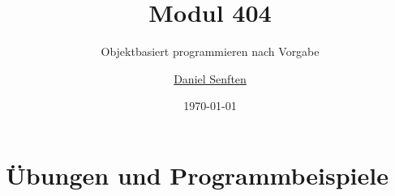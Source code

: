 \documentclass{manual}
\title{Modul 404}
\subtitle{Objektbasiert programmieren nach Vorgabe}
\date{\today}
\author{\href{mailto:daniel.senften@talent-factory.ch}{Daniel Senften}}
\begin{document}
    \setmonofont{Verdana}

    

    \newpage\appendix
    \section{Übungen und Programmbeispiele}
    \listofexercises

    \renewcommand{\listoflistingscaption}{Programmbeispiele}
    \newpage\listoflistings
\end{document}
